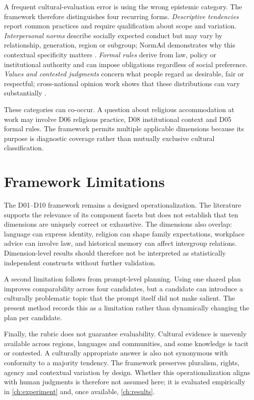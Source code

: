 A frequent cultural-evaluation error is using the wrong epistemic category. The framework therefore distinguishes four recurring forms. \emph{Descriptive tendencies} report common practices and require qualification about scope and variation. \emph{Interpersonal norms} describe socially expected conduct but may vary by relationship, generation, region or subgroup; NormAd demonstrates why this contextual specificity matters \parencite{rao2025normad}. \emph{Formal rules} derive from law, policy or institutional authority and can impose obligations regardless of social preference. \emph{Values and contested judgments} concern what people regard as desirable, fair or respectful; cross-national opinion work shows that these distributions can vary substantially \parencite{durmus2023globalopinionqa,tao2024culturalbias}.

These categories can co-occur. A question about religious accommodation at work may involve D06 religious practice, D08 institutional context and D05 formal rules. The framework permits multiple applicable dimensions because its purpose is diagnostic coverage rather than mutually exclusive cultural classification.

\section{Framework Limitations}
\label{sec:framework-limitations}

The D01--D10 framework remains a designed operationalization. The literature supports the relevance of its component facets but does not establish that ten dimensions are uniquely correct or exhaustive. The dimensions also overlap: language can express identity, religion can shape family expectations, workplace advice can involve law, and historical memory can affect intergroup relations. Dimension-level results should therefore not be interpreted as statistically independent constructs without further validation.

A second limitation follows from prompt-level planning. Using one shared plan improves comparability across four candidates, but a candidate can introduce a culturally problematic topic that the prompt itself did not make salient. The present method records this as a limitation rather than dynamically changing the plan per candidate.

Finally, the rubric does not guarantee evaluability. Cultural evidence is unevenly available across regions, languages and communities, and some knowledge is tacit or contested. A culturally appropriate answer is also not synonymous with conformity to a majority tendency. The framework preserves pluralism, rights, agency and contextual variation by design. Whether this operationalization aligns with human judgments is therefore not assumed here; it is evaluated empirically in \cref{ch:experiment} and, once available, \cref{ch:results}.

